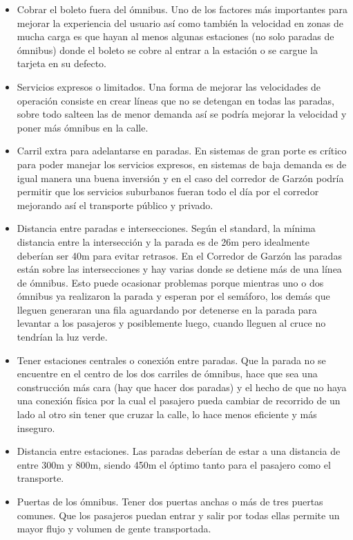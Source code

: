 \begin{itemize}
	\item Cobrar el boleto fuera del ómnibus. Uno de los factores más importantes para mejorar la experiencia del usuario así como también la velocidad en zonas de mucha carga es que hayan al menos algunas estaciones (no solo paradas de ómnibus) donde el boleto se cobre al entrar a la estación o se cargue la tarjeta en su defecto.
	\item Servicios expresos o limitados. Una forma de mejorar las velocidades de operación consiste en crear líneas que no se detengan en todas las paradas, sobre todo salteen las de menor demanda así se podría mejorar la velocidad y poner más ómnibus en la calle.
	\item Carril extra para adelantarse en paradas. En sistemas de gran porte es crítico para poder manejar los servicios expresos, en sistemas de baja demanda es de igual manera una buena inversión y en el caso del corredor de Garzón podría permitir que los servicios suburbanos fueran todo el día por el corredor mejorando así el transporte público y privado.
	\item Distancia entre paradas e intersecciones. Según el standard, la mínima distancia entre la intersección y la parada es de 26m pero idealmente deberían ser 40m para evitar retrasos. En el Corredor de Garzón las paradas están sobre las intersecciones y hay varias donde se detiene más de una línea de ómnibus. Esto puede ocasionar problemas porque mientras uno o dos ómnibus ya realizaron la parada y esperan por el semáforo, los demás que lleguen generaran una fila aguardando por detenerse en la parada para levantar a los pasajeros y posiblemente luego, cuando lleguen al cruce no tendrían la luz verde.
	\item Tener estaciones centrales o conexión entre paradas. Que la parada no se encuentre en el centro de los dos carriles de ómnibus, hace que sea una construcción más cara (hay que hacer dos paradas) y el hecho de que no haya una conexión física por la cual el pasajero pueda cambiar de recorrido de un lado al otro sin tener que cruzar la calle, lo hace menos eficiente y más inseguro.
	\item Distancia entre estaciones.  Las paradas deberían de estar a una distancia de entre 300m y 800m, siendo 450m el óptimo tanto para el pasajero como el transporte.
	\item Puertas de los ómnibus. Tener dos puertas anchas o más de tres puertas comunes. Que los pasajeros puedan entrar y salir por todas ellas permite un mayor flujo y volumen de gente transportada.

\end{itemize}
